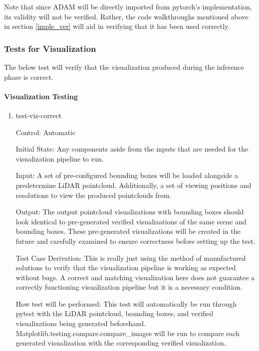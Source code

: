 \documentclass[12pt, titlepage]{article}
\begin{document}
Note that since ADAM will be directly imported from pytorch's implementation, its validity will not be verified. Rather, the code walkthroughs mentioned above in section \ref{imple_ver}
will aid in verifying that it has been used correctly.

\subsubsection{Tests for Visualization}

The below test will verify that the visualization produced during the inference phase is correct.

\paragraph{Visualization Testing}
\begin{enumerate}

  \item{test-viz-correct\\}
  
  Control: Automatic
            
  Initial State: Any components aside from the inputs that are needed for the visualization pipeline to run.
            
  Input: A set of pre-configured bounding boxes will be loaded alongside a predetermine LiDAR pointcloud. Additionally, a set of viewing positions and resolutions
  to view the produced pointclouds from.

  Output: The output pointcloud visualizations with bounding boxes should look identical to pre-generated verified visualizations of the same scene and bounding boxes. These
  pre-generated visualizations will be created in the future and carefully examined to ensure correctness before setting up the test.
  
  Test Case Derivation: This is really just using the method of manufactured solutions to verify that the visualization pipeline is working as expected without bugs. A correct
  and matching visualization here does not guarantee a correctly functioning visualization pipeline but it is a necessary condition.
            
  How test will be performed: This test will automatically be run through pytest with the LiDAR pointcloud, bounding boxes, and verified visualizations being generated beforehand.
  Matplotlib.testing.compare.compare\_images will be run to compare each generated visualization with the corresponding verified visualization.
\end{enumerate}
\end{document}
